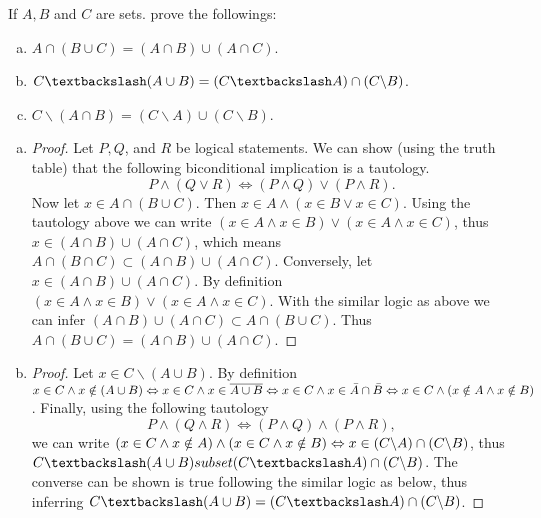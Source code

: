 \begin{question} 
	If $A, B$ and $C$ are sets. prove the followings:
	\begin{enumerate}[(a)]
		\item $A \cap (B \cup C) = (A \cap B) \cup (A \cap C)$. \label{section-a}
		\item $C \textbackslash (A \cup B) = (C \textbackslash A) \cap (C \backslash B)$.
		
		\item $C \backslash (A \cap B) = (C \backslash A) \cup (C \backslash B) $.
		
	\end{enumerate}
	
	\begin{ans}
		\begin{enumerate}[(a)]
			\item 
			\begin{proof}
			Let $P, Q$, and $R$ be logical statements. We can show (using the truth table) that the following biconditional implication is a tautology. \[ P \wedge (Q \vee R) \Leftrightarrow (P \wedge Q) \vee (P \wedge R). \]
			Now let $x \in A \cap (B \cup C)$. Then $x \in A \wedge (x \in B \vee x \in C)$. Using the tautology above we can write $(x \in A \wedge x \in B) \vee (x \in A \wedge x \in C)$, thus $x \in (A \cap B) \cup (A \cap C) $, which means $A \cap (B \cap C) \subset (A \cap B) \cup (A \cap C)$. Conversely, let $x \in (A \cap B) \cup (A \cap C)$. By definition $(x \in A \wedge x \in B) \vee (x \in A \wedge x \in C)$. With the similar logic as above we can infer $(A \cap B) \cup (A \cap C) \subset A \cap (B \cup C)$. Thus $A \cap (B \cup C) = (A \cap B) \cup (A \cap C)$.
			\end{proof}
			
			\item 
			\begin{proof}
			Let $x \in C \backslash (A \cup B)$. By definition $x \in C \wedge x \notin (A \cup B) \Leftrightarrow x \in C \wedge x \in \overline{A \cup B} \Leftrightarrow x \in C \wedge x \in \bar{A} \cap \bar{B} \Leftrightarrow x \in C \wedge (x \notin A \wedge x \notin B)$. Finally, using the following tautology 
			\[ P \wedge (Q \wedge R) \Leftrightarrow (P \wedge Q) \wedge (P \wedge R), \]
			we can write $(x \in C \wedge x \notin A) \wedge (x \in C \wedge x \notin B) \Leftrightarrow x \in (C \backslash A) \cap (C \backslash B) $, thus $C \textbackslash (A \cup B) subset (C \textbackslash A) \cap (C \backslash B)$. The converse can be shown is true following the similar logic as below, thus inferring $C \textbackslash (A \cup B) = (C \textbackslash A) \cap (C \backslash B)$.
			\end{proof}
			

\end{enumerate}
\end{ans}
\end{question}
